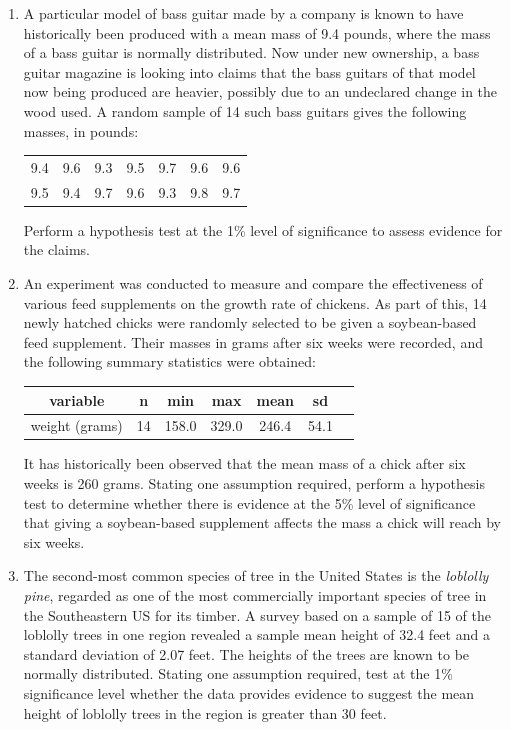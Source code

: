 \documentclass[
  11pt,
]{book}
\begin{document}
\begin{enumerate}[resume]
\item A particular model of bass guitar made by a company is known to have historically been produced with a mean mass of 9.4 pounds, where the mass of a bass guitar is normally distributed. Now under new ownership, a bass guitar magazine is looking into claims that the bass guitars of that model now being produced are heavier, possibly due to an undeclared change in the wood used. A random sample of 14 such bass guitars gives the following masses, in pounds:
    \begin{center}
    \begin{tabular}{ccccccc} 
      9.4 & 9.6 & 9.3 & 9.5 & 9.7 & 9.6 & 9.6\\
      9.5 & 9.4 & 9.7 & 9.6 & 9.3 & 9.8 & 9.7
    \end{tabular}
    \end{center}
    Perform a hypothesis test at the 1\% level of significance to assess evidence for the claims.
\item An experiment was conducted to measure and compare the effectiveness of various feed supplements on the growth rate of chickens. As part of this, 14 newly hatched chicks were randomly selected to be given a soybean-based feed supplement. Their masses in grams after six weeks were recorded, and the following summary statistics were obtained:
\begin{center}
\begin{tabular}{ccccccc}
variable & n & min & max & mean & sd\\
  \hline
weight (grams) & 14 & 158.0 & 329.0 & 246.4 & 54.1\\
\end{tabular}
\end{center}
It has historically been observed that the mean mass of a chick after six weeks is 260 grams. Stating one assumption required, perform a hypothesis test to determine whether there is evidence at the 5\% level of significance that giving a soybean-based supplement affects the mass a chick will reach by six weeks.
    \item The second-most common species of tree in the United States is the \textit{loblolly pine}, regarded as one of the most commercially important species of tree in the Southeastern US for its timber. A survey based on a sample of 15 of the loblolly trees in one region revealed a sample mean height of 32.4 feet and a standard deviation of 2.07 feet. The heights of the trees are known to be normally distributed. Stating one assumption required, test at the 1\% significance level whether the data provides evidence to suggest the mean height of loblolly trees in the region is greater than 30 feet.

\end{enumerate}
\end{document}
